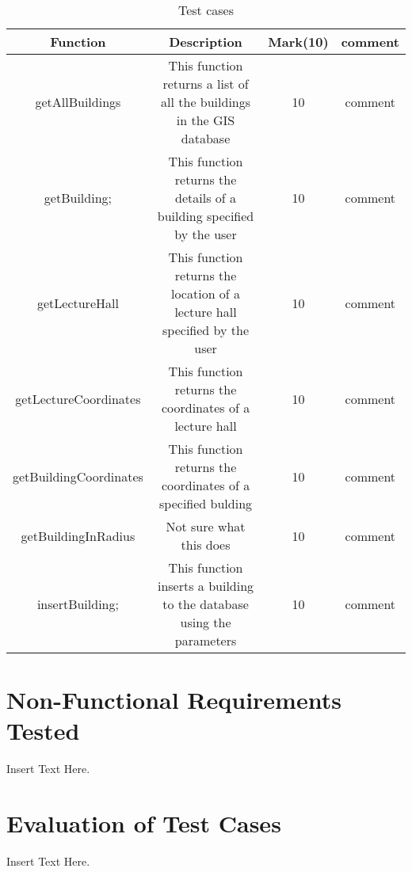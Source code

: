 \documentclass[12pt]{article}
\begin{document}
		
		\begin{table}[h!]	
			\newlength{\longline}
			\settowidth{\longline}{This function returns a}
			\centering
			\caption{Test cases }
			\label{tab:table1}
			\begin{tabular}{|c|c|c|c|}
				
				\hline
				\hline
				Function  & Description & Mark(10)  & comment\\
				\hline
				\hline
				
				getAllBuildings  & \parbox[t]{\longline}{This function returns a list of all the buildings in the GIS database} & 10 & \parbox[t]{\longline}{comment}\\
				
				\hline
				getBuilding; & \parbox[t]{\longline}{This function returns the details of a building specified by the user} &  10 & \parbox[t]{\longline}{comment}\\
				\hline
				getLectureHall & \parbox[t]{\longline}{This function returns the location of a lecture hall specified by the user} & 10 & \parbox[t]{\longline}{comment}\\
				\hline
				getLectureCoordinates & \parbox[t]{\longline}{This function returns the coordinates of a lecture hall} & 10 & \parbox[t]{\longline}{comment}\\
				\hline
				getBuildingCoordinates & \parbox[t]{\longline}{This function returns the coordinates of a specified bulding} &  10 & \parbox[t]{\longline}{comment}\\
				\hline
				getBuildingInRadius & \parbox[t]{\longline}{Not sure what this does} & 10 & \parbox[t]{\longline}{comment}\\
				\hline
				insertBuilding; & \parbox[t]{\longline}{This function inserts a building to the database using the parameters} &  10 & \parbox[t]{\longline}{comment}\\
				\hline
			\end{tabular}
	
		\end{table}
	
		



\section{Non-Functional Requirements Tested}
Insert Text Here.

\section{Evaluation of Test Cases}
Insert Text Here.
\end{document}

